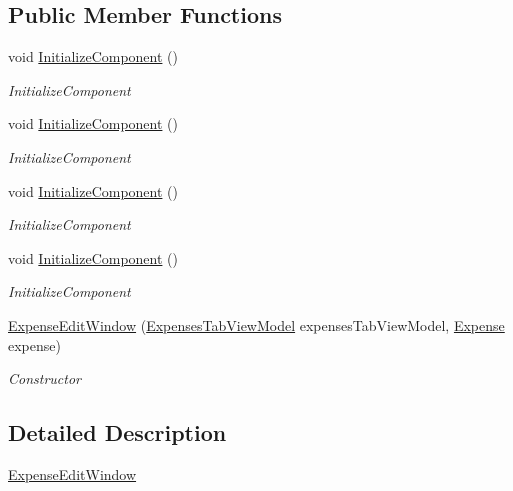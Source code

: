 \subsection*{Public Member Functions}
\begin{DoxyCompactItemize}
\item 
void \hyperlink{class_baudi_1_1_client_1_1_view_1_1_edit_windows_1_1_expense_edit_window_a1ae1c768bedda25450159c40a79b2cea}{Initialize\+Component} ()
\begin{DoxyCompactList}\small\item\em Initialize\+Component \end{DoxyCompactList}\item 
void \hyperlink{class_baudi_1_1_client_1_1_view_1_1_edit_windows_1_1_expense_edit_window_a1ae1c768bedda25450159c40a79b2cea}{Initialize\+Component} ()
\begin{DoxyCompactList}\small\item\em Initialize\+Component \end{DoxyCompactList}\item 
void \hyperlink{class_baudi_1_1_client_1_1_view_1_1_edit_windows_1_1_expense_edit_window_a1ae1c768bedda25450159c40a79b2cea}{Initialize\+Component} ()
\begin{DoxyCompactList}\small\item\em Initialize\+Component \end{DoxyCompactList}\item 
void \hyperlink{class_baudi_1_1_client_1_1_view_1_1_edit_windows_1_1_expense_edit_window_a1ae1c768bedda25450159c40a79b2cea}{Initialize\+Component} ()
\begin{DoxyCompactList}\small\item\em Initialize\+Component \end{DoxyCompactList}\item 
\hyperlink{class_baudi_1_1_client_1_1_view_1_1_edit_windows_1_1_expense_edit_window_accc20a52c8a33cac3685c962ea0a7750}{Expense\+Edit\+Window} (\hyperlink{class_baudi_1_1_client_1_1_view_models_1_1_tabs_view_models_1_1_expenses_tab_view_model}{Expenses\+Tab\+View\+Model} expenses\+Tab\+View\+Model, \hyperlink{class_baudi_1_1_d_a_l_1_1_models_1_1_expense}{Expense} expense)
\begin{DoxyCompactList}\small\item\em Constructor \end{DoxyCompactList}\end{DoxyCompactItemize}


\subsection{Detailed Description}
\hyperlink{class_baudi_1_1_client_1_1_view_1_1_edit_windows_1_1_expense_edit_window}{Expense\+Edit\+Window} 


